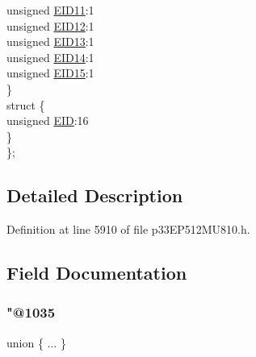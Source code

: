\begin{DoxyCompactItemize}
\begin{tabbing}
\>\>unsigned \hyperlink{structtag_c2_r_x_m0_e_i_d_b_i_t_s_a710bdb0d602deb021b0be99066008018}{EID11}:1\\
\>\>unsigned \hyperlink{structtag_c2_r_x_m0_e_i_d_b_i_t_s_aa347bb85867bd8d4e0124f7cff8c6472}{EID12}:1\\
\>\>unsigned \hyperlink{structtag_c2_r_x_m0_e_i_d_b_i_t_s_a37d5f3edcbf6ef62f848fd4f3c584f79}{EID13}:1\\
\>\>unsigned \hyperlink{structtag_c2_r_x_m0_e_i_d_b_i_t_s_a7ffc0b0e0d99b8476b6f9a45337c17ab}{EID14}:1\\
\>\>unsigned \hyperlink{structtag_c2_r_x_m0_e_i_d_b_i_t_s_a293cd7dc1746257fa75a60cbd9383cd7}{EID15}:1\\
\>\} \\
\>struct \{\\
\>\>unsigned \hyperlink{structtag_c2_r_x_m0_e_i_d_b_i_t_s_ae80b378c9141f7c03e0b4e55b5f4b54d}{EID}:16\\
\>\} \\
\}; \\

\end{tabbing}\end{DoxyCompactItemize}


\subsection{Detailed Description}


Definition at line 5910 of file p33\+E\+P512\+M\+U810.\+h.



\subsection{Field Documentation}
\mbox{\label{structtag_c2_r_x_m0_e_i_d_b_i_t_s_aef4c8867cdfff3e6fba2c48b219b98ef}} 
\subsubsection{\texorpdfstring{"@1035}{@1035}}
{\footnotesize\ttfamily union \{ ... \} }

\mbox{\label{structtag_c2_r_x_m0_e_i_d_b_i_t_s_ae80b378c9141f7c03e0b4e55b5f4b54d}} 
